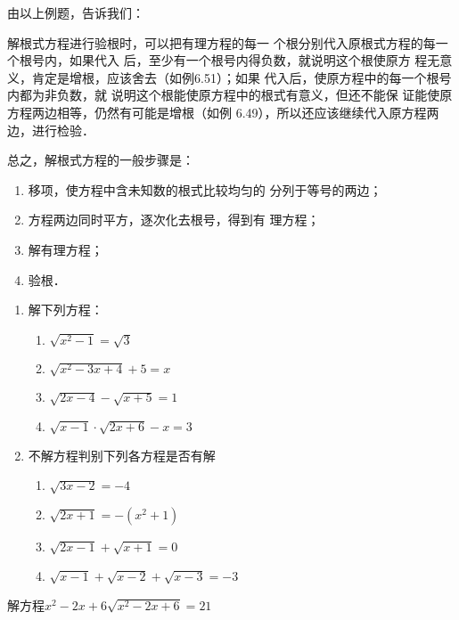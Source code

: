由以上例题，告诉我们：

解根式方程进行验根时，可以把有理方程的每一
个根分别代入原根式方程的每一个根号内，如果代入
后，至少有一个根号内得负数，就说明这个根使原方
程无意义，肯定是增根，应该舍去（如例6.51）；如果
代入后，使原方程中的每一个根号内都为非负数，就
说明这个根能使原方程中的根式有意义，但还不能保
证能使原方程两边相等，仍然有可能是增根（如例
6.49），所以还应该继续代入原方程两边，进行检验．

总之，解根式方程的一般步骤是：
\begin{enumerate}
    \item 移项，使方程中含未知数的根式比较均匀的
    分列于等号的两边；
    \item 方程两边同时平方，逐次化去根号，得到有
    理方程；
    \item 解有理方程；
    \item 验根．
\end{enumerate}

\begin{ex}
\begin{enumerate}
    \item 解下列方程：
    \begin{multicols}{2}
      \begin{enumerate}
    \item $\sqrt{x^2-1}=\sqrt{3}$
    \item $\sqrt{x^2-3x+4}+5=x$
    \item $\sqrt{2x-4}-\sqrt{x+5}=1$
    \item $\sqrt{x-1}\cdot \sqrt{2x+6}-x=3$
    \end{enumerate}      
    \end{multicols}


    \item 不解方程判别下列各方程是否有解
      \begin{enumerate}
        \item $\sqrt{3x-2}=-4$
    \item $\sqrt{2x+1}=-(x^2+1)$
    \item $\sqrt{2x-1}+\sqrt{x+1}=0$
    \item $\sqrt{x-1}+\sqrt{x-2}+\sqrt{x-3}=-3$
    \end{enumerate}  
\end{enumerate}
\end{ex}

\begin{example}
解方程$x^2-2x+6\sqrt{x^2-2x+6}=21$
\end{example}


